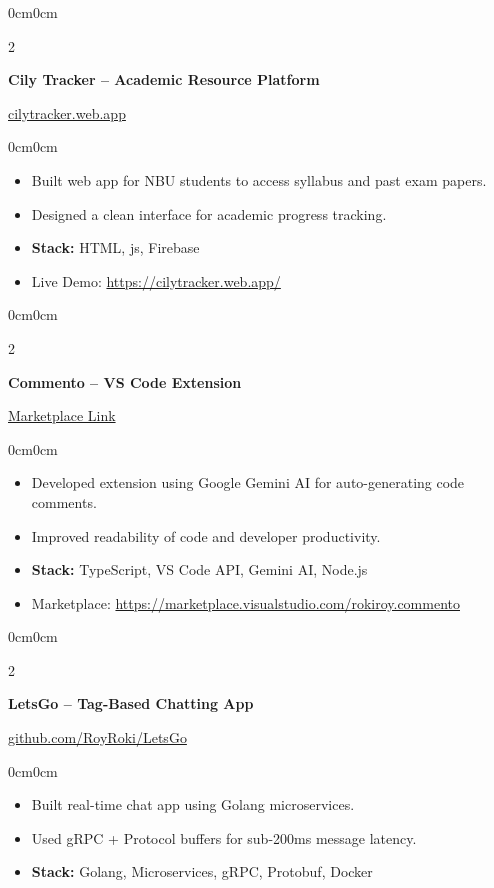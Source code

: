 \documentclass[10pt, letterpaper]{article}
\newenvironment{highlights}{
    \begin{itemize}[topsep=0pt, parsep=0.3pt, itemsep=0pt, leftmargin=10pt]
}{
    \end{itemize}
}
\newenvironment{onecolentry}{\begin{adjustwidth}{0cm}{0cm}}{\end{adjustwidth}}
\newenvironment{twocolentry}[2][]{
    \onecolentry
    \def\secondColumn{#2}
    \setcolumnwidth{\fill, 4.2cm}
    \begin{paracol}{2}
}{
    \switchcolumn \raggedleft \secondColumn
    \end{paracol}
    \endonecolentry
}
\begin{document}
\begin{twocolentry}{\href{https://cilytracker.web.app/}{cilytracker.web.app}}
    \textbf{Cily Tracker – Academic Resource Platform}
\end{twocolentry}
\begin{onecolentry}
    \begin{highlights}
        \item Built web app for NBU students to access syllabus and past exam papers.
        \item Designed a clean interface for academic progress tracking.
        \item \textbf{Stack:} HTML, js, Firebase
        \item Live Demo: \href{https://cilytracker.web.app/}{https://cilytracker.web.app/}
    \end{highlights}
\end{onecolentry}

\begin{twocolentry}{\href{https://marketplace.visualstudio.com/items?itemName=rokiroy.commento}{Marketplace Link}}
    \textbf{Commento – VS Code Extension}
\end{twocolentry}
\begin{onecolentry}
    \begin{highlights}
        \item Developed extension using Google Gemini AI for auto-generating code comments.
        \item Improved readability of code and developer productivity.
        \item \textbf{Stack:} TypeScript, VS Code API, Gemini AI, Node.js
        \item Marketplace: \href{https://marketplace.visualstudio.com/items?itemName=rokiroy.commento}{https://marketplace.visualstudio.com/rokiroy.commento}
    \end{highlights}
\end{onecolentry}

\begin{twocolentry}{\href{https://github.com/RoyRoki/LetsGo}{github.com/RoyRoki/LetsGo}}
    \textbf{LetsGo – Tag-Based Chatting App}
\end{twocolentry}
\begin{onecolentry}
    \begin{highlights}
        \item Built real-time chat app using Golang microservices.
        \item Used gRPC + Protocol buffers for sub-200ms message latency.
        \item \textbf{Stack:} Golang, Microservices, gRPC, Protobuf, Docker \end{highlights}
\end{onecolentry}
\end{document}
